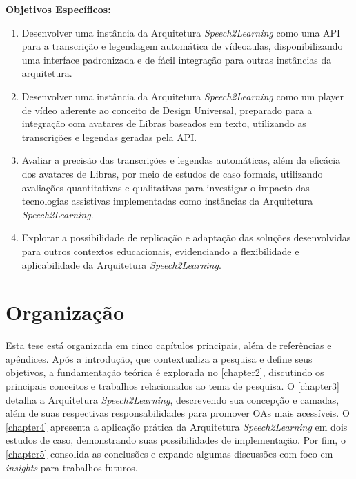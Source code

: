 \textbf{Objetivos Específicos:}

\begin{enumerate}
\item Desenvolver uma instância da Arquitetura \textit{Speech2Learning} como uma API para a transcrição e legendagem automática de vídeoaulas, disponibilizando uma interface padronizada e de fácil integração para outras instâncias da arquitetura.
\item Desenvolver uma instância da Arquitetura \textit{Speech2Learning} como um player de vídeo aderente ao conceito de Design Universal, preparado para a integração com avatares de Libras baseados em texto, utilizando as transcrições e legendas geradas pela API.
\item Avaliar a precisão das transcrições e legendas automáticas, além da eficácia dos avatares de Libras, por meio de estudos de caso formais, utilizando avaliações quantitativas e qualitativas para investigar o impacto das tecnologias assistivas implementadas como instâncias da Arquitetura \textit{Speech2Learning}.
\item Explorar a possibilidade de replicação e adaptação das soluções desenvolvidas para outros contextos educacionais, evidenciando a flexibilidade e aplicabilidade da Arquitetura \textit{Speech2Learning}.
\end{enumerate}

\section{Organização}

Esta tese está organizada em cinco capítulos principais, além de referências e apêndices. Após a introdução, que contextualiza a pesquisa e define seus objetivos, a fundamentação teórica é explorada no \autoref{chapter2}, discutindo os principais conceitos e trabalhos relacionados ao tema de pesquisa. O \autoref{chapter3} detalha a Arquitetura \textit{Speech2Learning}, descrevendo sua concepção e camadas, além de suas respectivas responsabilidades para promover OAs mais acessíveis. O \autoref{chapter4} apresenta a aplicação prática da Arquitetura \textit{Speech2Learning} em dois estudos de caso, demonstrando suas possibilidades de implementação. Por fim, o \autoref{chapter5} consolida as conclusões e expande algumas discussões com foco em \textit{insights} para trabalhos futuros.